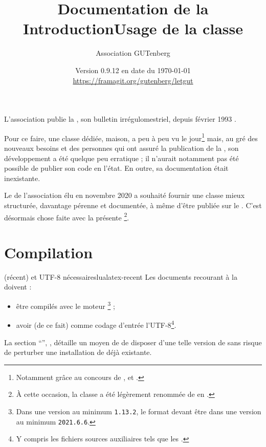 \documentclass{letgut}
\title{%
  Documentation de la
  \texorpdfstring{%
    \letgutcls%
  }{%
    classe letgut%
  }%
}
\author{Association GUTenberg}
\date{%
  Version 0.9.12 en date du \today%
  \texorpdfstring{%
    \\
    \url{https://framagit.org/gutenberg/letgut}%
  }{%
  }%
}
\begin{document}

\title{Introduction}
\label{sec:introduction}
L'association \gutenberg{} publie la , son bulletin irrégulomestriel,
depuis février 1993 \autocite{AssociationGUTenbergLettreGUTenberg}.

Pour ce faire, une classe  dédiée, maison, a peu à peu vu le
jour\footnote{Notamment grâce au concours de ,
   et .} mais, au gré des
nouveaux besoins et des personnes qui ont assuré la publication de la ,
son développement a été quelque peu erratique ; il n'aurait notamment pas été
possible de publier son code en l'état. En outre, sa documentation était
inexistante.

Le \ca{} de l'association élu en novembre 2020 a souhaité fournir une classe
mieux structurée, davantage pérenne et documentée, à même d'être publiée sur le
\ctan{}. C'est désormais chose faite avec la présente \footnote{À
  cette occasion, la classe a été légèrement renommée de  en
  .}.

\title{Usage de la classe }
\label{sec:usage-de-la}

\section{Compilation}
\label{sec:compilation}

\begin{dbwarning}{ (récent) et UTF-8 nécessaires}{lualatex-recent}
  Les documents recourant à la  doivent :
  \begin{itemize}
  \item être compilés avec le moteur \footnote{Dans une version
      au minimum \texttt{1.13.2}, le format  devant être dans
      une version au minimum \texttt{2021.6.6}.} ;
  \item avoir (de ce fait) comme codage d'entrée l'UTF-8\footnote{Y compris les
      fichiers sources auxiliaires tels que les .}.
  \end{itemize}
\end{dbwarning}

La section \enquote{}, ,
détaille un moyen de de disposer d'une telle version de  sans
risque de perturber une installation de  déjà existante.
\end{document}
